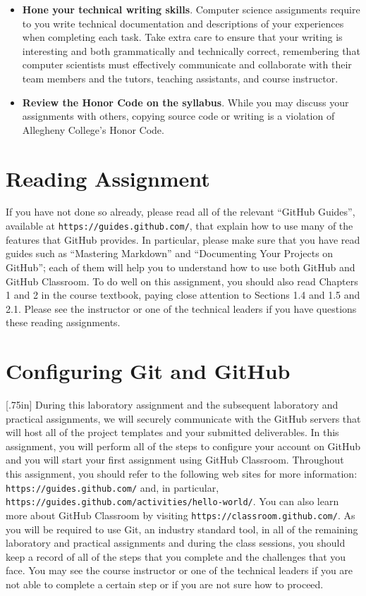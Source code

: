 \documentclass[11pt]{article}
\newcommand{\url}[1]{\lstinline{#1}}
\newcommand{\resource}[1]{\null\hfill\LARGE{\faLink{}}\newline\scriptsize{\em{#1}}}
\begin{document}
\begin{itemize}
\item {\bf Hone your technical writing skills}. Computer science assignments
  require to you write technical documentation and descriptions of your
  experiences when completing each task. Take extra care to ensure that your
  writing is interesting and both grammatically and technically correct,
  remembering that computer scientists must effectively communicate and
  collaborate with their team members and the tutors, teaching assistants, and
  course instructor.

\item {\bf Review the Honor Code on the syllabus}. While you may discuss your
  assignments with others, copying source code or writing is a violation of
  Allegheny College's Honor Code.

\end{itemize}

\section*{Reading Assignment}

If you have not done so already, please read all of the relevant ``GitHub
Guides'', available at \url{https://guides.github.com/}, that explain how to use
many of the features that GitHub provides. In particular, please make sure that
you have read guides such as ``Mastering Markdown'' and ``Documenting Your
Projects on GitHub''; each of them will help you to understand how to use both
GitHub and GitHub Classroom. To do well on this assignment, you should also read
Chapters 1 and 2 in the course textbook, paying close attention to Sections 1.4
and 1.5 and 2.1. Please see the instructor or one of the technical leaders if
you have questions these reading assignments.

\section*{Configuring Git and GitHub}

\marginnote{\resource{Learn about GitHub}}[.75in] During this laboratory
assignment and the subsequent laboratory and practical assignments, we will
securely communicate with the GitHub servers that will host all of the project
templates and your submitted deliverables. In this assignment, you will perform
all of the steps to configure your account on GitHub and you will start your
first assignment using GitHub Classroom. Throughout this assignment, you should
refer to the following web sites for more information:
\url{https://guides.github.com/} and, in particular,
\url{https://guides.github.com/activities/hello-world/}. You can also learn more
about GitHub Classroom by visiting \url{https://classroom.github.com/}. As you
will be required to use Git, an industry standard tool, in all of the remaining
laboratory and practical assignments and during the class sessions, you should
keep a record of all of the steps that you complete and the challenges that you
face. You may see the course instructor or one of the technical leaders if you
are not able to complete a certain step or if you are not sure how to proceed.
\end{document}
